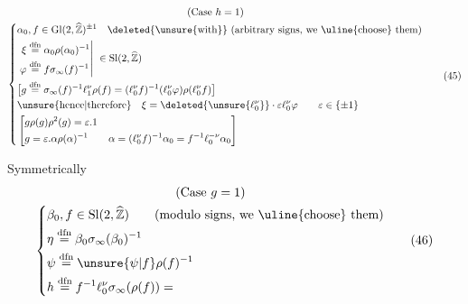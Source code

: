\[
\begin{gathered}
\text{(Case }h=1\text{)}\\
\left\{
\begin{aligned}
 &\alpha_0,f\in\mathrm{Gl}(2,\widehat{\mathbb Z})^{\pm1}
 \quad \deleted{\unsure{\text{with}}}\ \text{(arbitrary signs, we \uline{choose} them)}\\
 &\left.
 \begin{aligned}
 \xi&\overset{\mathrm{dfn}}=\alpha_0\rho(\alpha_0)^{-1}\\
 \varphi&\overset{\mathrm{dfn}}=f\sigma_\infty(f)^{-1}
 \end{aligned}
 \right|\ \in\mathrm{Sl}(2,\widehat{\mathbb Z})\\
 &\bigl[g\overset{\mathrm{dfn}}=\sigma_\infty(f)^{-1}\ell_1^\nu\rho(f)
 =(\ell_0^\nu f)^{-1}(\ell_0^\nu\varphi)\rho(\ell_0^\nu f)\bigr]\\
 &\text{\unsure{hence|therefore}}\quad
 \xi=\deleted{\unsure{\ell_0^{\nu}}}\cdot\varepsilon\ell_0^\nu\varphi
 \qquad\varepsilon\in\{\pm1\}\\
 &\left[\begin{aligned}
 &g\rho(g)\rho^2(g)=\varepsilon.1\\
 &g=\varepsilon.\alpha\rho(\alpha)^{-1}
 \qquad\alpha=(\ell_0^\nu f)^{-1}\alpha_0=f^{-1}\ell_0^{-\nu}\alpha_0
 \end{aligned}\right]
\end{aligned}
\right.
\end{gathered}
\tag{45}
\]


Symmetrically
\[
\begin{gathered}
\text{(Case }g=1\text{)}\\
\left\{
\begin{aligned}
 &\beta_0,f\in\mathrm{Sl}(2,\widehat{\mathbb Z})
 \qquad\text{(modulo signs, we \uline{choose} them)}\\
 &\eta\overset{\mathrm{dfn}}=\beta_0\sigma_\infty(\beta_0)^{-1}\\
 &\psi\overset{\mathrm{dfn}}=\unsure{\psi|f}\rho(f)^{-1}\\
 &h\overset{\mathrm{dfn}}=f^{-1}\ell_0^\nu\sigma_\infty(\rho(f))=
\end{aligned}
\right.
\end{gathered}
\tag{46}
\]

